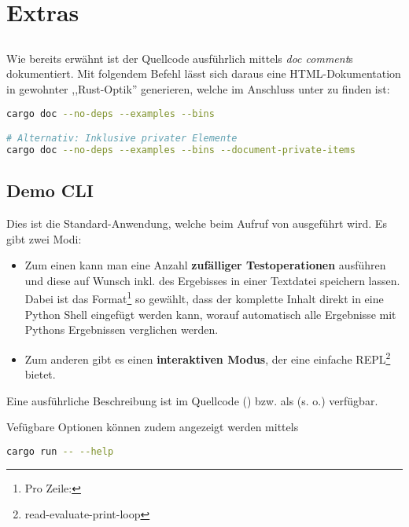 \section{Extras}\label{sec:extras}

\subsection{}
Wie bereits erwähnt ist der Quellcode ausführlich mittels \emph{doc comment}s dokumentiert.
Mit folgendem Befehl lässt sich daraus eine HTML-Dokumentation in gewohnter ,,Rust-Optik'' generieren, welche im Anschluss unter  zu finden ist:

\begin{lstlisting}[language=bash]
cargo doc --no-deps --examples --bins

# Alternativ: Inklusive privater Elemente
cargo doc --no-deps --examples --bins --document-private-items
\end{lstlisting}

\subsection{Demo CLI}
Dies ist die Standard-Anwendung, welche beim Aufruf von  ausgeführt wird.
Es gibt zwei Modi:
\begin{itemize}
    \item Zum einen kann man eine Anzahl \textbf{zufälliger Testoperationen} ausführen und diese auf Wunsch inkl. des Ergebisses in einer Textdatei speichern lassen. Dabei ist das Format\footnote{Pro Zeile: } so gewählt, dass der komplette Inhalt direkt in eine Python Shell eingefügt werden kann, worauf automatisch alle Ergebnisse mit Pythons Ergebnissen verglichen werden.

    \item Zum anderen gibt es einen \textbf{interaktiven Modus}, der eine einfache REPL\footnote{read-evaluate-print-loop} bietet.
\end{itemize}

Eine ausführliche Beschreibung ist im Quellcode () bzw. als  (s. o.) verfügbar.

Vefügbare Optionen können zudem angezeigt werden mittels
\begin{lstlisting}[language=bash]
cargo run -- --help
\end{lstlisting}


